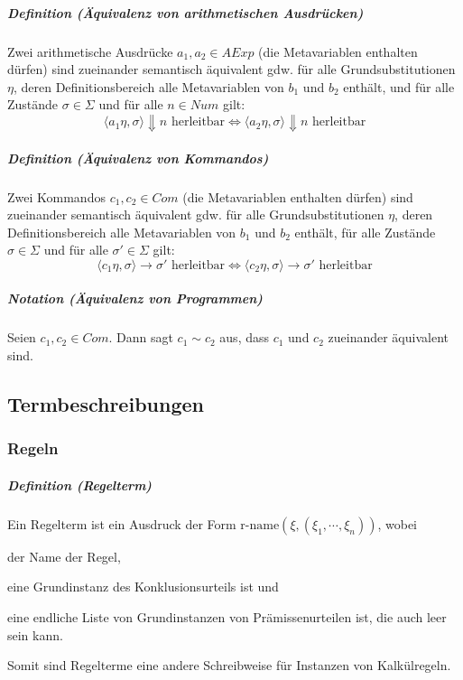 \documentclass[a4paper, 11pt, accentcolor = tud3b]{tudreport}
\newcommand{\definition}[2]{\subparagraph{Definition (#1)} #2}
\newcommand{\notation}[2]{\subparagraph{Notation (#1)} #2}
\begin{document}
				\definition{Äquivalenz von arithmetischen Ausdrücken}{
					Zwei arithmetische Ausdrücke $ a _ 1, a _ 2 \in \textit{AExp} $ (die Metavariablen enthalten dürfen) sind zueinander semantisch äquivalent gdw. für alle Grundsubstitutionen $ \eta $, deren Definitionsbereich alle Metavariablen von $ b _ 1 $ und $ b _ 2 $ enthält, und für alle Zustände $ \sigma \in \Sigma $ und für alle $ n \in \textit{Num} $ gilt:
					\begin{equation*}
						\langle a _ 1 \eta, \sigma \rangle \Downarrow n \text{ herleitbar} \iff \langle a _ 2 \eta, \sigma \rangle \Downarrow n \text{ herleitbar}
					\end{equation*}
				}
				
				\definition{Äquivalenz von Kommandos}{
					Zwei Kommandos $ c _ 1, c _ 2 \in \textit{Com} $ (die Metavariablen enthalten dürfen) sind zueinander semantisch äquivalent gdw. für alle Grundsubstitutionen $ \eta $, deren Definitionsbereich alle Metavariablen von $ b _ 1 $ und $ b _ 2 $ enthält, für alle Zustände $ \sigma \in \Sigma $ und für alle $ \sigma' \in \Sigma $ gilt:
					\begin{equation*}
						\langle c _ 1 \eta, \sigma \rangle \rightarrow \sigma' \text{ herleitbar} \iff \langle c _ 2 \eta, \sigma \rangle \rightarrow \sigma' \text{ herleitbar}
					\end{equation*}
				}
				
				\notation{Äquivalenz von Programmen}{Seien $ c _ 1, c _ 2 \in \textit{Com} $. Dann sagt $ c _ 1 \sim c _ 2 $ aus, dass $ c _ 1 $ und $ c _ 2 $ zueinander äquivalent sind.}
		    
		    \subsection{Termbeschreibungen}
			    \subsubsection{Regeln}
				    \definition{Regelterm}{
					    Ein Regelterm ist ein Ausdruck der Form $ \text{r-name}(\xi, (\xi _ 1, \cdots, \xi _ n)) $, wobei
					    \begin{description}[leftmargin = 3cm]
					    	\item[r-name] der Name der Regel,
					    	\item[$ \xi $] eine Grundinstanz des Konklusionsurteils ist und
					    	\item[$ (\xi _ 1, \cdots, \xi _ n) $] eine endliche Liste von Grundinstanzen von Prämissenurteilen ist, die auch leer sein kann.
					    \end{description}
					    
					    Somit sind Regelterme eine andere Schreibweise für Instanzen von Kalkülregeln.
					}
					
\end{document}
